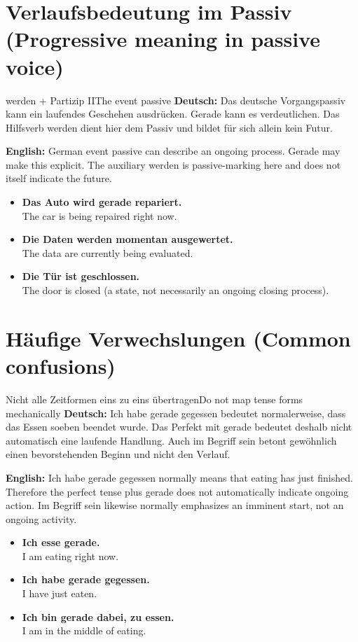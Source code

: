 \documentclass[a4paper,11pt]{article}
\newcommand{\GermanText}[1]{\textbf{Deutsch: }#1\par}
\newcommand{\EnglishText}[1]{{\small\color{SoftGray}\textbf{English: }#1\par}}
\newcommand{\ExampleItem}[2]{\item \textbf{#1}\\{\small\color{SoftGray}#2}}
\begin{document}
\section{Verlaufsbedeutung im Passiv \textnormal{(Progressive meaning in passive voice)}}
\begin{grammarentry}{werden + Partizip II}{The event passive}
\GermanText{Das deutsche Vorgangspassiv kann ein laufendes Geschehen ausdrücken. Gerade kann es verdeutlichen. Das Hilfsverb werden dient hier dem Passiv und bildet für sich allein kein Futur.}
\EnglishText{German event passive can describe an ongoing process. Gerade may make this explicit. The auxiliary werden is passive-marking here and does not itself indicate the future.}
\end{grammarentry}
\begin{exbox}
\begin{itemize}
\ExampleItem{Das Auto wird gerade repariert.}{The car is being repaired right now.}
\ExampleItem{Die Daten werden momentan ausgewertet.}{The data are currently being evaluated.}
\ExampleItem{Die Tür ist geschlossen.}{The door is closed (a state, not necessarily an ongoing closing process).}
\end{itemize}
\end{exbox}

\section{Häufige Verwechslungen \textnormal{(Common confusions)}}
\begin{grammarentry}{Nicht alle Zeitformen eins zu eins übertragen}{Do not map tense forms mechanically}
\GermanText{Ich habe gerade gegessen bedeutet normalerweise, dass das Essen soeben beendet wurde. Das Perfekt mit gerade bedeutet deshalb nicht automatisch eine laufende Handlung. Auch im Begriff sein betont gewöhnlich einen bevorstehenden Beginn und nicht den Verlauf.}
\EnglishText{Ich habe gerade gegessen normally means that eating has just finished. Therefore the perfect tense plus gerade does not automatically indicate ongoing action. Im Begriff sein likewise normally emphasizes an imminent start, not an ongoing activity.}
\end{grammarentry}
\begin{exbox}
\begin{itemize}
\ExampleItem{Ich esse gerade.}{I am eating right now.}
\ExampleItem{Ich habe gerade gegessen.}{I have just eaten.}
\ExampleItem{Ich bin gerade dabei, zu essen.}{I am in the middle of eating.}
\end{itemize}
\end{exbox}
\end{document}
